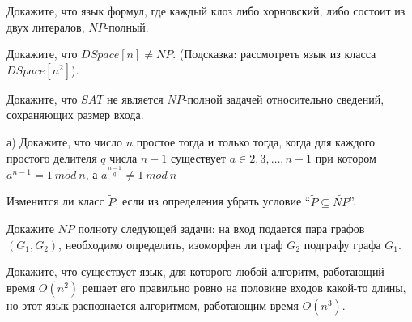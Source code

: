 \setcounter{curtask}{37}


\begin{task}
	Докажите, что язык формул, где каждый клоз либо хорновский, либо состоит из двух
    литералов, $NP$-полный.
\end{task}

\begin{task}
    Докажите, что $DSpace[n] \ne NP$.
    (Подсказка: рассмотреть язык из класса $DSpace[n^2]$).
\end{task}

\begin{task}
	Докажите, что $SAT$ не является $NP$-полной задачей относительно сведений,
    сохраняющих размер входа.
\end{task}

\breakline

\begin{ptask}{29}
    а) Докажите, что число $n$ простое тогда и только тогда, когда для каждого
    простого делителя $q$ числа $n - 1$ существует $a \in {2, 3, \dots, n - 1}$ при котором
    $a^{n - 1} = 1~mod~n$, а $a^{\frac{n - 1}{q}} \ne 1~mod~n$
\end{ptask}

\begin{ptask}{30}
    Изменится ли класс $\widetilde{P}$, если из определения убрать условие
    ``$\widetilde{P} \subseteq \widetilde{NP}$''.
\end{ptask}

\begin{ptask}{31}
    Докажите $NP$ полноту следующей задачи:
    на вход подается пара графов $(G_1, G_2)$, необходимо определить, изоморфен ли
    граф $G_2$ подграфу графа $G_1$.
\end{ptask}

\begin{ptask}{36}
    Докажите, что существует язык, для которого любой алгоритм, работающий время
    $O(n^2)$ решает его правильно ровно на половине входов какой-то длины, но
    этот язык распознается алгоритмом, работающим время $O(n^3)$.
\end{ptask}
